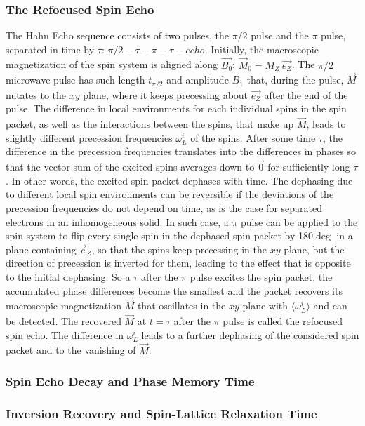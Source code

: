 \subsubsection{The Refocused Spin Echo}
The Hahn Echo sequence consists of two pulses, the $\pi/2$ pulse and the $\pi$ pulse, separated in time by $\tau$: $\pi/2 - \tau - \pi - \tau - echo$. Initially, the macroscopic magnetization of the spin system is aligned along $\vec{B_0}$: $\vec{M}_0=M_Z~\vec{e_Z}$. The $\pi/2$ microwave pulse has such length $t_{\pi/2}$ and amplitude $B_1$ that, during the pulse, $\vec{M}$ nutates to the $xy$ plane, where it keeps precessing about $\vec{e_Z}$ after the end of the pulse. The difference in local environments for each individual spins in the spin packet, as well as the interactions between the spins, that make up $\vec{M}$, leads to slightly different precession frequencies $\omega_L^i$ of the spins. After some time $\tau$, the difference in the precession frequencies translates into the differences in phases so that the vector sum of the excited spins averages down to $\vec{0}$ for sufficiently long $\tau$. In other words, the excited spin packet dephases with time. The dephasing due to different local spin environments can be reversible if the deviations of the precession frequencies do not depend on time, as is the case for separated electrons in an inhomogeneous solid. In such case, a $\pi$ pulse can be applied to the spin system to flip every single spin in the dephased spin packet by 180$\deg$ in a plane containing $\vec{e}_Z$, so that the spins keep precessing in the $xy$ plane, but the direction of precession is inverted for them, leading to the effect that is opposite to the initial dephasing. So a $\tau$ after the $\pi$ pulse excites the spin packet, the accumulated phase differences become the smallest and the packet recovers its macroscopic magnetization $\vec{M}$ that oscillates in the $xy$ plane with $\langle\omega_L^i\rangle$ and can be detected. The recovered $\vec{M}$ at $t=\tau$ after the $\pi$ pulse is called the refocused spin echo. The difference in $\omega_L^i$ leads to a further dephasing of the considered spin packet and to the vanishing of $\vec{M}$.\\
\subsubsection{Spin Echo Decay and Phase Memory Time}


\subsubsection{Inversion Recovery and Spin-Lattice Relaxation Time}

